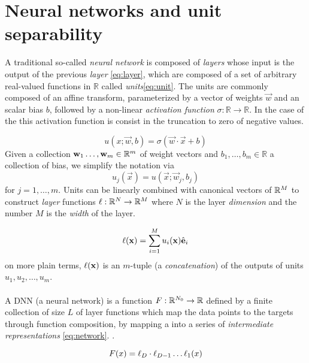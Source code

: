 \section{Neural networks and unit separability}\label{sec:separability}

A traditional so-called \emph{neural network} is composed of \emph{layers} whose input is the output of the previous \emph{layer} \ref{eq:layer}, which are composed of a set of arbitrary real-valued functions in $\mathbb{R}$ called \emph{units}\ref{eq:unit}. The units are commonly composed of an affine transform, parameterized by a vector of weights $\vec{w}$ and an scalar bias $b$, followed by a non-linear \emph{activation function} $\sigma : \mathbb{R}\rightarrow\mathbb{R}$. In the case of the \ReLU this activation function is consist in the truncation to zero of negative values.

\begin{equation}\label{eq:unit}
u(x; \vec{w}, b) = \sigma(\vec{w} \cdot \vec{x} + b)
\end{equation}
Given a collection $\mathbf{w}_1\ldots,\mathbf{w}_m\in\mathbb{R}^{m}$ of weight vectors and $b_1,\ldots,b_m\in\mathbb{R}$ a collection of bias, we simplify the notation via
\begin{equation}
    u_j(\vec{x}) = u(\vec{x};\vec{w}_j,b_j)
\end{equation}
for $j=1,\ldots,m$. Units can be linearly combined with canonical vectors of $\mathbb{R}^{M}$ to construct \emph{layer} functions $\ell:\mathbb{R}^{N}\rightarrow\mathbb{R}^{M}$ where $N$ is the layer \emph{dimension} and the number $M$ is the \emph{width} of the layer.

\begin{equation}\label{eq:layer}
\ell(\mathbf{x}) = \sum^M_{i=1} u_i(\mathbf{x}) \hat{\textbf{e}}_i
\end{equation}
on more plain terms, $\ell(\mathbf{x})$ is an $m$-tuple (a \emph{concatenation}) of the outputs of units $u_1,u_2,\ldots,u_m$.
\\\\
A DNN (a neural network) is a function $F:\mathbb{R}^{N_0}\rightarrow\mathbb{R}$ defined by a finite collection of size $L$ of layer functions which map the data points to the targets through function composition, by mapping a into a series of \emph{intermediate representations} \ref{eq:network}. \cite{ramachandranEtAl2017SearchingForActivationFunctions,eswaranSingh2015SomeTheoremsForFFNN}.

\begin{equation}\label{eq:network}
F(x) = \ell_D \cdot \ell_{D-1} \dots \ell_1(x) 
\end{equation}

